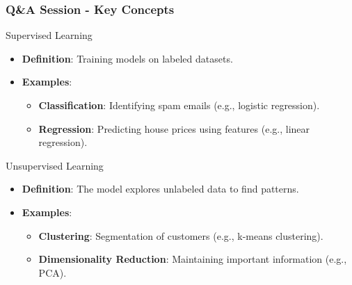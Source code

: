 \documentclass[aspectratio=169]{beamer}
\begin{document}
\begin{frame}[fragile]
    \frametitle{Q\&A Session - Key Concepts}
    \begin{block}{Supervised Learning}
        \begin{itemize}
            \item \textbf{Definition}: Training models on labeled datasets.
            \item \textbf{Examples}:
                \begin{itemize}
                    \item \textbf{Classification}: Identifying spam emails (e.g., logistic regression).
                    \item \textbf{Regression}: Predicting house prices using features (e.g., linear regression).
                \end{itemize}
        \end{itemize}
    \end{block}

    \begin{block}{Unsupervised Learning}
        \begin{itemize}
            \item \textbf{Definition}: The model explores unlabeled data to find patterns.
            \item \textbf{Examples}:
                \begin{itemize}
                    \item \textbf{Clustering}: Segmentation of customers (e.g., k-means clustering).
                    \item \textbf{Dimensionality Reduction}: Maintaining important information (e.g., PCA).
                \end{itemize}
        \end{itemize}
    \end{block}
\end{frame}
\end{document}
